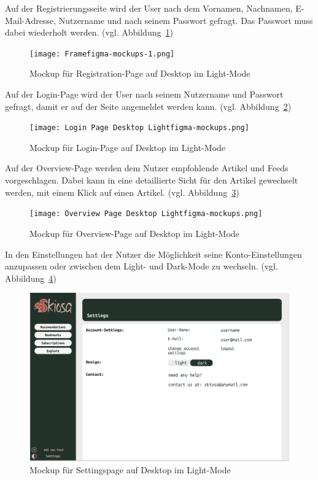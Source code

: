 Auf der Registrierungsseite wird der User nach dem 
Vornamen, Nachnamen, E-Mail-Adresse, Nutzername und nach seinem Passwort gefragt. Das Passwort muss dabei wiederholt werden. (vgl. Abbildung~\ref{fig:Registration Page Light})

\begin{figure}[H]
    \texttt{[image: Framefigma-mockups-1.png]}
    \caption{Mockup für Registration-Page auf Desktop im Light-Mode}
    \label{fig:Registration Page Light}
\end{figure}

Auf der Login-Page wird der User nach seinem Nutzername und Passwort gefragt, damit er auf der Seite angemeldet werden kann. (vgl. Abbildung~\ref{fig:Login Page Desktop Light})

\begin{figure}[H]
    \texttt{[image: Login Page Desktop Lightfigma-mockups.png]}
    \caption{Mockup für Login-Page auf Desktop im Light-Mode}
    \label{fig:Login Page Desktop Light}
\end{figure}

Auf der Overview-Page werden dem Nutzer empfohlende Artikel und Feeds vorgeschlagen. Dabei kann in eine detaillierte Sicht für den Artikel gewechselt werden, mit einem Klick auf einen Artikel. (vgl. Abbildung~\ref{fig:Overview Page Desktop Light})

\begin{figure}[H]
    \texttt{[image: Overview Page Desktop Lightfigma-mockups.png]}
    \caption{Mockup für Overview-Page auf Desktop im Light-Mode}
    \label{fig:Overview Page Desktop Light}
\end{figure}

In den Einstellungen hat der Nutzer die Möglichkeit seine Konto-Einstellungen anzupassen oder zwischen dem Light- und Dark-Mode zu wechseln. (vgl. Abbildung~\ref{fig:Settings Interface Desktop Light})

\begin{figure}[H]
    \includegraphics[width=\linewidth]{images/Settings Interface Desktop Lightfigma-mockups.png}
    \caption{Mockup für Settingspage auf Desktop im Light-Mode}
    \label{fig:Settings Interface Desktop Light}
\end{figure}

